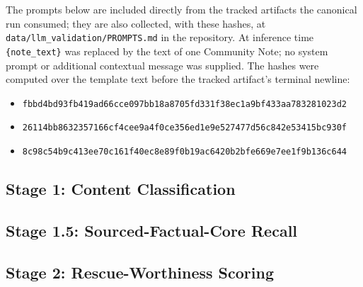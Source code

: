 \documentclass[10pt,twocolumn]{article}
\begin{document}
The prompts below are included directly from the tracked artifacts the
canonical run consumed; they are also collected, with these hashes, at
\texttt{data/llm\_validation/PROMPTS.md} in the repository. At inference time
\verb|{note_text}| was replaced by the text of one Community Note; no system
prompt or additional contextual message was supplied. The hashes were computed
over the template text before the tracked artifact's terminal newline:
\begin{itemize}[nosep,leftmargin=1.7cm]
  \item[Stage 1:] \texttt{fbbd4bd93fb419ad66cce097bb18a8705fd331f38ec1a9bf433aa783281023d2}
  \item[Stage 1.5:] \texttt{26114bb8632357166cf4cee9a4f0ce356ed1e9e527477d56c842e53415bc930f}
  \item[Stage 2:] \texttt{8c98c54b9c413ee70c161f40ec8e89f0b19ac6420b2bfe669e7ee1f9b136c644}
\end{itemize}

\subsection{Stage 1: Content Classification}

\subsection{Stage 1.5: Sourced-Factual-Core Recall}

\subsection{Stage 2: Rescue-Worthiness Scoring}
\end{document}
